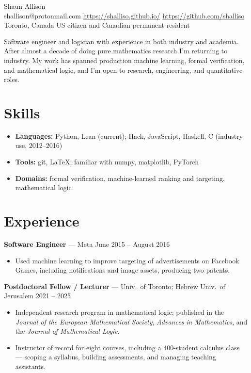 \documentclass[letterpaper,10pt]{article}
\def\name{Shaun Allison}
\newcommand{\role}[3]{\textbf{#1} \textnormal{---} #2 \hfill #3\par\vspace{1pt}}
\begin{document}
\begin{center}
  {\LARGE \name}\\[3pt]
  shallison@protonmail.com \quad\textbullet\quad
  \url{https://shalliso.github.io/} \quad\textbullet\quad
  \url{https://github.com/shalliso}\\[1pt]
  Toronto, Canada \quad\textbullet\quad US citizen and Canadian permanent
  resident
\end{center}

\vspace{2pt}

Software engineer and logician with experience in both industry and academia. After almost a decade of doing pure mathematics research I'm returning to industry. My work has spanned production machine learning, formal verification, and mathematical logic, and I'm open to research, engineering, and quantitative roles.

\section{Skills}

\begin{itemize}
  \item \textbf{Languages:} Python, Lean (current); Hack, JavaScript,
        Haskell, C (industry use, 2012--2016)
  \item \textbf{Tools:} git, \LaTeX{}; familiar with numpy,
        matplotlib, PyTorch
  \item \textbf{Domains:} formal verification, machine-learned ranking and
        targeting, mathematical logic
\end{itemize}

\section{Experience}

\role{Software Engineer}{Meta}{June 2015 -- August 2016}
\begin{itemize}
  \item Used machine learning to improve targeting of advertisements on Facebook Games, including notifications and image assets, producing two patents.
\end{itemize}

\vspace{3pt}
\role{Postdoctoral Fellow / Lecturer}{Univ.\ of Toronto; Hebrew Univ.\ of
Jerusalem}{2021 -- 2025}
\begin{itemize}
  \item Independent research program in mathematical logic; published in the
        \emph{Journal of the European Mathematical Society}, \emph{Advances in
        Mathematics}, and the \emph{Journal of Mathematical Logic}.
  \item Instructor of record for eight courses, including a 400-student
        calculus class --- scoping a syllabus, building assessments, and
        managing teaching assistants.
\end{itemize}
\end{document}
